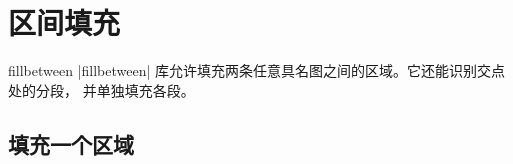 
\section{区间填充}
\label{sec:fillbetween}

\begin{pgfplotslibrary}{fillbetween}
    |fillbetween| 库允许填充两条任意具名图之间的区域。它还能识别交点处的分段，
    并单独填充各段。
\end{pgfplotslibrary}

\begingroup
\def\pgfplotsmanualcurlibrary{fillbetween}


\subsection{填充一个区域}

